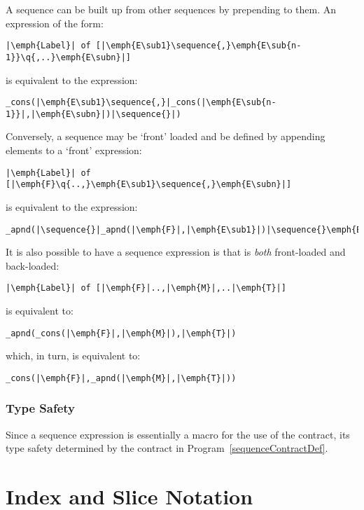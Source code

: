 A sequence can be built up from other sequences by prepending to them. An expression of the form:
\begin{lstlisting}[escapechar=|]
|\emph{Label}| of [|\emph{E\sub1}\sequence{,}\emph{E\sub{n-1}}\q{,..}\emph{E\subn}|]
\end{lstlisting}
is equivalent to the expression:
\begin{lstlisting}[escapechar=|]
_cons(|\emph{E\sub1}\sequence{,}|_cons(|\emph{E\sub{n-1}}|,|\emph{E\subn}|)|\sequence{}|)
\end{lstlisting}

Conversely, a sequence may be `front' loaded and be defined by appending elements to a `front' expression:
\begin{lstlisting}[escapechar=|]
|\emph{Label}| of [|\emph{F}\q{..,}\emph{E\sub1}\sequence{,}\emph{E\subn}|]
\end{lstlisting}
is equivalent to the expression:
\begin{lstlisting}[escapechar=|]
_apnd(|\sequence{}|_apnd(|\emph{F}|,|\emph{E\sub1}|)|\sequence{}\emph{E\subn}|)
\end{lstlisting}

\begin{aside}
It is also possible to have a sequence expression is that is \emph{both} front-loaded and back-loaded:
\begin{lstlisting}[escapechar=|]
|\emph{Label}| of [|\emph{F}|..,|\emph{M}|,..|\emph{T}|]
\end{lstlisting}
is equivalent to:
\begin{lstlisting}[escapechar=|]
_apnd(_cons(|\emph{F}|,|\emph{M}|),|\emph{T}|)
\end{lstlisting}
which, in turn, is equivalent to:
\begin{lstlisting}[escapechar=|]
_cons(|\emph{F}|,_apnd(|\emph{M}|,|\emph{T}|))
\end{lstlisting}
\end{aside}

\subsubsection{Type Safety}
Since a sequence expression is essentially a macro for the use of the  contract, its type safety determined by the  contract in Program~\vref{sequenceContractDef}.

\section{Index and Slice Notation}
\label{indexNotation}

